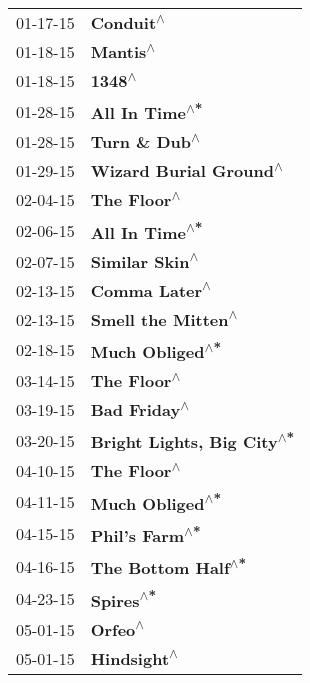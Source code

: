\begin{supertabular}{p{0.25\columnwidth}p{0.75\columnwidth}}
 01-17-15 &                   \textbf{Conduit\textsuperscript{$\wedge$}} \\
 01-18-15 &                    \textbf{Mantis\textsuperscript{$\wedge$}} \\
 01-18-15 &                      \textbf{1348\textsuperscript{$\wedge$}} \\
 01-28-15 &              \textbf{All In Time\textsuperscript{$\wedge$*}} \\
 01-28-15 &               \textbf{Turn \& Dub\textsuperscript{$\wedge$}} \\
 01-29-15 &      \textbf{Wizard Burial Ground\textsuperscript{$\wedge$}} \\
 02-04-15 &                 \textbf{The Floor\textsuperscript{$\wedge$}} \\
 02-06-15 &              \textbf{All In Time\textsuperscript{$\wedge$*}} \\
 02-07-15 &              \textbf{Similar Skin\textsuperscript{$\wedge$}} \\
 02-13-15 &               \textbf{Comma Later\textsuperscript{$\wedge$}} \\
 02-13-15 &          \textbf{Smell the Mitten\textsuperscript{$\wedge$}} \\
 02-18-15 &             \textbf{Much Obliged\textsuperscript{$\wedge$*}} \\
 03-14-15 &                 \textbf{The Floor\textsuperscript{$\wedge$}} \\
 03-19-15 &                \textbf{Bad Friday\textsuperscript{$\wedge$}} \\
 03-20-15 &  \textbf{Bright Lights, Big City\textsuperscript{$\wedge$*}} \\
 04-10-15 &                 \textbf{The Floor\textsuperscript{$\wedge$}} \\
 04-11-15 &             \textbf{Much Obliged\textsuperscript{$\wedge$*}} \\
 04-15-15 &              \textbf{Phil's Farm\textsuperscript{$\wedge$*}} \\
 04-16-15 &          \textbf{The Bottom Half\textsuperscript{$\wedge$*}} \\
 04-23-15 &                   \textbf{Spires\textsuperscript{$\wedge$*}} \\
 05-01-15 &                     \textbf{Orfeo\textsuperscript{$\wedge$}} \\
 05-01-15 &                 \textbf{Hindsight\textsuperscript{$\wedge$}} \\

\end{supertabular}
